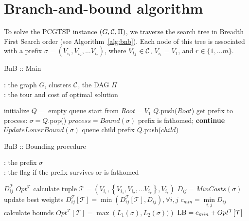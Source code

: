 \section{Branch-and-bound algorithm}\label{sec:SA}

To solve the PCGTSP instance
$(G,\mathcal{C},\Pi)$,
we traverse the search tree in
Breadth First Search order
(see Algorithm~\ref{alg:bnb}).
Each node of this tree is associated with
a prefix
$\sigma = \left(V_{i_1}, V_{i_2}, \dots V_{i_r} \right)$,
where
$V_{i_j} \in \mathcal{C}$,
$V_{i_1} = V_1$,
and
$r \in \{{1, \dots m}\}$.

\begin{algorithm}[h!]
\caption{BnB :: Main}\label{alg:bnb}
\hspace*{\algorithmicindent}{\bf Input}: the graph $G$, clusters $\mathcal{C}$, the DAG $\Pi$ \\
\hspace*{\algorithmicindent}{\bf Output}: the tour and cost of optimal solution
\begin{algorithmic}[1]
    \STATE initialize $Q =$ empty queue
    \STATE start from $Root = V_1$
    \STATE $Q$.push($Root$)
        \STATE get prefix to process: $\sigma = Q$.pop()
        \STATE $process = Bound(\sigma)$
            \STATE prefix is fathomed; {\bf continue}
        \ENDIF
        \STATE $UpdateLowerBound(\sigma)$
            \STATE queue child prefix $Q$.push($child$)
        \ENDFOR
    \ENDWHILE
\end{algorithmic}
\end{algorithm}

\begin{algorithm}[h!]
\caption{BnB :: Bounding procedure}\label{alg:bnb:bound}
\hspace*{\algorithmicindent}{\bf Input}: the prefix $\sigma$ \\
\hspace*{\algorithmicindent}{\bf Output}: the flag if the prefix survives or is fathomed
\begin{algorithmic}[1]
     $D_{ij}^{\mathcal T}$
     $Opt^{\mathcal T}$
    \STATE calculate tuple $\mathcal T = \left(V_{i_1},
        \left\{V_{i_1}, V_{i_2}, \dots V_{i_r}\right\}, V_{i_r} \right)$
        \label{alg:bnb:bound:key}
    \STATE $D_{ij} = MinCosts(\sigma)$
        \label{alg:bnb:bound:pfx}
        \RETURN \FALSE
    \ENDIF
    \STATE  update best weights $D_{ij}^{\mathcal T}[\mathcal T]  = \min \left(
        D_{ij}^{\mathcal T}[\mathcal T], D_{ij} \right),
        \forall i, j$
    \STATE  $c_{min} = \min\limits_{i, j} D_{ij}$
        \STATE calculate bounds $Opt^{\mathcal T}[\mathcal T] = \max\left(L_1(\sigma), L_2(\sigma))\right)$
        \label{alg:bnb:bound:sfx}
    \ENDIF
    \STATE $\mathrm{LB} = c_{min} + Opt^{\mathcal T}[\mathcal T]$
        \label{alg:bnb:bound:lb}
    \IF{$\LB > \UB$}
        \RETURN \FALSE
    \ENDIF
    \RETURN \TRUE
\end{algorithmic}
\end{algorithm}

